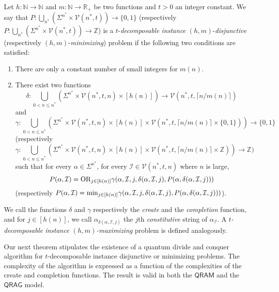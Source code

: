 \documentclass[12pt]{article}
\newcommand{\N}{\mathbb{N}}
\newcommand{\R}{\mathbb{R}}
\newcommand{\Z}{\mathbb{Z}}
\theoremstyle{definition}
\begin{document}
Let $h: \N \rightarrow \N$ and $m:\N\rightarrow\R_+$ be two functions and $t > 0$ an integer constant.
We say that $P: \bigcup_{n^*} (\Sigma^{n^*} \times \mathcal{V}(n^*,t)) \rightarrow \{0,1\}$ (respectively $P: \bigcup_{n^*} (\Sigma^{n^*} \times \mathcal{V}(n^*,t))  \rightarrow \Z$) is a $t$-{\em decomposable instance} $(h,m)$-{\em disjunctive} (respectively $(h,m)$-{\em minimizing}) problem if the following two conditions are satisfied:
\begin{enumerate}
\item
There are only a constant number of small integers for $m(n)$.
\item
There exist two functions
$$\delta : \bigcup_{0 < n \leq n^*} (\Sigma^{n^*} \times \mathcal{V}(n^*,t, n) \times [h(n)]) \rightarrow 
\mathcal{V}(n^*,t,  \lceil n/m(n) \rceil)$$
and
$$\gamma : \bigcup_{0 < n \leq n^*} (\Sigma^{n^*} \times \mathcal{V}(n^*,t, n) \times [h(n)] \times 
\mathcal{V}(n^*,t,  \lceil n/m(n) \rceil \times  \{0,1\} )) \rightarrow  \{0,1\} $$
(respectively
$$\gamma : \bigcup_{0 < n \leq n^*} (\Sigma^{n^*} \times \mathcal{V}(n^*,t, n) \times [h(n)] \times 
\mathcal{V}(n^*,t,  \lceil n/m(n) \rceil \times  \Z )) \rightarrow  \Z )$$
such that for every $\alpha \in \Sigma^{n^*}$, for every 
$\mathcal{I} \in  \mathcal{V}(n^*,t,n)$ where $n$ is large,
$$P(\alpha, \mathcal{I}) = {\rm OR}_{j \in [h(n)]} \gamma(\alpha, \mathcal{I}, j, \delta(\alpha, \mathcal{I}, j), 
P(\alpha, \delta(\alpha, \mathcal{I}, j)))$$
(respectively 
$P(\alpha, \mathcal{I}) = {\rm \min}_{j \in [h(n)]} \gamma(\alpha, \mathcal{I}, j, \delta(\alpha, \mathcal{I}, j), 
P(\alpha, \delta(\alpha, \mathcal{I}, j)))$).
\end{enumerate}
We call the functions $\delta$ and $\gamma$  respectively the {\em create} and the {\em completion} function, and for $j \in [h(n)]$, we call $\alpha_{\delta(\alpha, \mathcal{I}, j)}$ the $j$th  {\em constitutive} string of $\alpha_{\mathcal{I}}$.
A {\em $t$-decomposable instance $(h,m)$-maximizing} problem is defined analogously. 

Our next theorem stipulates the existence of a quantum divide and conquer algorithm for $t$-decomposable instance disjunctive or minimizing problems. 
The complexity of the algorithm is expressed as a function of the complexities of the create and completion functions.
The result is valid in both the $\mathsf{QRAM}$  and the $\mathsf{QRAG}$ model.
\end{document}
